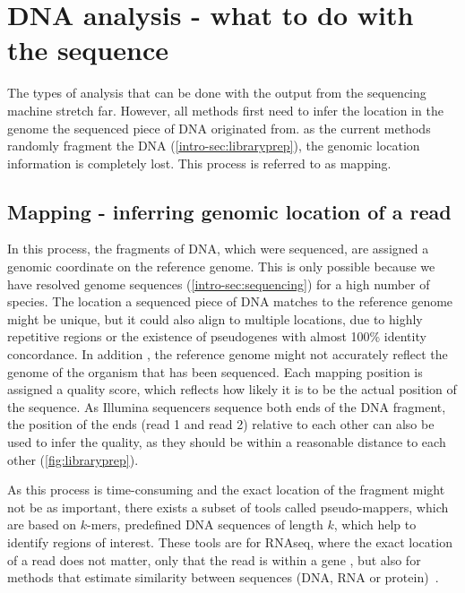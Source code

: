 \section[DNA analysis]{DNA analysis - what to do with the sequence}
\label{intro-sec:analysis}
The types of analysis that can be done with the output from the sequencing machine stretch far.  However, all methods first need to infer the location in the genome the sequenced piece of DNA originated from. as the current methods randomly fragment the DNA (\autoref{intro-sec:libraryprep}), the genomic location information is completely lost. This process is referred to as mapping.

\subsection[Mapping]{Mapping - inferring genomic location of a read}
\label{intro-sec:mapping}
In this process, the fragments of DNA, which were sequenced, are assigned a genomic coordinate on the reference genome. This  is only possible because we have resolved genome sequences (\autoref{intro-sec:sequencing}) for a high number of species. The location a sequenced piece of DNA matches to the reference genome might be unique, but it could also align to multiple locations, due to highly repetitive regions or  the existence of pseudogenes with almost 100\% identity concordance. In addition , the reference genome might not accurately reflect the genome of the organism that has been sequenced. Each mapping position is  assigned a quality score, which reflects how likely it is to be the actual position of the sequence. As Illumina sequencers  sequence both ends of the DNA fragment, the position of the ends (read 1 and read 2) relative to each other can also be used to infer the quality, as they should be within a reasonable distance to each other (\autoref{fig:libraryprep}).

As this process is time-consuming and the exact location of the fragment might not be as important, there exists a subset of tools called pseudo-mappers, which are based on $k$-mers,  predefined DNA sequences of length $k$, which help to identify  regions of interest. These tools are  for RNAseq, where the exact location of a read does not matter, only that the read is within a gene \cite{Bray2016,Patro2017}, but also for methods that estimate  similarity between sequences (DNA, RNA or protein)~\cite{Ondov2016,Luczak2017}.

